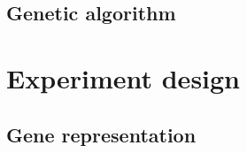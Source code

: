 \documentclass[sigconf]{acmart}
\begin{document}
\subsection{Genetic algorithm}

\section{Experiment design}



\subsection{Gene representation}












\end{document}
